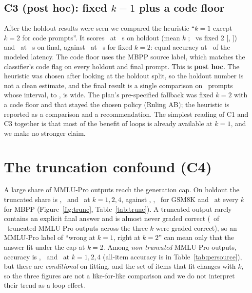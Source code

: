 \documentclass[11pt]{article}
\makeatletter
\def\sg@aux#1#2\relax{\if#1-$-$#2\else\if#1+{+}#2\else{+}#1#2\fi\fi}
\newcommand{\sg}[1]{\expandafter\sg@aux#1\relax}
\makeatother
\begin{document}
\subsection{C3 (post hoc): fixed \texorpdfstring{$k{=}1$}{k=1} plus a code floor}
\label{sec:c3}
After the holdout results were seen we compared the heuristic ``$k{=}1$ except $k{=}2$ for code prompts''. It scores \HoldoutFloorAcc\ at \HoldoutFloorSec\ s on holdout (mean $k$ \HoldoutFloorMeanK; \sg{\HoldoutFloorDelta}\ vs fixed 2 [\sg{\HoldoutFloorLo}, \sg{\HoldoutFloorHi}]) and \FinalFloorAcc\ at \FinalFloorSec\ s on final, against \FinalFixedTwoAcc\ at \FinalFixedTwoSec\ s for fixed $k{=}2$: equal accuracy at \FloorLatencyRatio\ of the modeled latency. The code floor uses the MBPP source label, which matches the classifier's code flag on every holdout and final prompt. This is \textbf{post hoc}. The heuristic was chosen after looking at the holdout split, so the holdout number is not a clean estimate, and the final result is a single comparison on \FinalN\ prompts whose interval, \sg{\FinalFloorLo} to \sg{\FinalFloorHi}, is wide. The plan's pre-specified fallback was fixed $k{=}2$ with a code floor and that stayed the chosen policy (Ruling AB); the heuristic is reported as a comparison and a recommendation. The simplest reading of C1 and C3 together is that most of the benefit of loops is already available at $k{=}1$, and we make no stronger claim.

\begin{table}[t]
\centering\small

\caption{Holdout (post-regrade), policies against fixed $k{=}2$. Modeled seconds as defined in Section~\ref{sec:setup}. The ``code floor'' rows are post hoc (C3).}
\label{tab:holdout}
\end{table}

\section{The truncation confound (C4)}
\label{sec:trunc}
A large share of MMLU-Pro outputs reach the generation cap. On holdout the truncated share is \HoldoutMmluKOneTruncRate, \HoldoutMmluKTwoTruncRate\ and \HoldoutMmluKFourTruncRate\ at $k{=}1,2,4$, against \HoldoutGsmKOneTruncRate, \HoldoutGsmKTwoTruncRate, \HoldoutGsmKFourTruncRate\ for GSM8K and \HoldoutMbppKOneTruncRate\ at every $k$ for MBPP (Figure~\ref{fig:trunc}, Table~\ref{tab:trunc}). A truncated output rarely contains an explicit final answer and is almost never graded correct (\HoldoutMmluTruncCorrect\ of \HoldoutMmluTruncTotal\ truncated MMLU-Pro outputs across the three $k$ were graded correct), so an MMLU-Pro label of ``wrong at $k{=}1$, right at $k{=}2$'' can mean only that the answer fit under the cap at $k{=}2$. Among \emph{non-truncated} MMLU-Pro outputs, accuracy is \HoldoutMmluKOneAccNT, \HoldoutMmluKTwoAccNT\ and \HoldoutMmluKFourAccNT\ at $k{=}1,2,4$ (all-item accuracy is in Table~\ref{tab:persource}), but these are \emph{conditional} on fitting, and the set of items that fit changes with $k$, so the three figures are not a like-for-like comparison and we do not interpret their trend as a loop effect.
\end{document}
